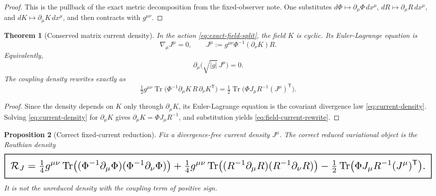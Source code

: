 \documentclass[11pt,a4paper]{article}
\numberwithin{equation}{section}
\DeclareMathOperator{\Tr}{Tr}
\newcommand{\geomboxed}[1]{%
  \setlength{\fboxsep}{8pt}%
  \setlength{\fboxrule}{0.9pt}%
  \fbox{\scalebox{1.5}{$\displaystyle #1$}}%
}
\theoremstyle{thmcompact}
\newtheorem{theorem}{Theorem}[section]
\newtheorem{proposition}[theorem]{Proposition}
\theoremstyle{remark}
\begin{document}
\begin{proof}
This is the pullback of the exact metric decomposition from the fixed-observer note. One substitutes $d\Phi\mapsto\partial_\mu\Phi\,dx^\mu$, $dR\mapsto\partial_\mu R\,dx^\mu$, and $dK\mapsto\partial_\mu K\,dx^\mu$, and then contracts with $g^{\mu\nu}$.
\end{proof}

\begin{theorem}[Conserved matrix current density]
\label{thm:field-current}
In the action \eqref{eq:exact-field-split}, the field $K$ is cyclic. Its Euler-Lagrange equation is
\begin{equation}
\nabla_\mu J^\mu = 0,
\qquad
J^\mu:=g^{\mu\nu}\Phi^{-1}(\partial_\nu K)R.
\label{eq:current-density}
\end{equation}
Equivalently,
\begin{equation}
\partial_\mu\bigl(\sqrt{|g|}\,J^\mu\bigr)=0.
\label{eq:current-density-div}
\end{equation}
The coupling density rewrites exactly as
\begin{equation}
\tfrac12 g^{\mu\nu}\Tr\bigl(\Phi^{-1}\partial_\mu K\,R\,\partial_\nu K^{\mathsf T}\bigr)
=
\tfrac12 \Tr\bigl(\Phi J_\mu R^{-1}(J^\mu)^{\mathsf T}\bigr).
\label{eq:field-current-rewrite}
\end{equation}
\end{theorem}

\begin{proof}
Since the density depends on $K$ only through $\partial_\mu K$, its Euler-Lagrange equation is the covariant divergence law \eqref{eq:current-density}. Solving \eqref{eq:current-density} for $\partial_\mu K$ gives $\partial_\mu K=\Phi J_\mu R^{-1}$, and substitution yields \eqref{eq:field-current-rewrite}.
\end{proof}

\begin{proposition}[Correct fixed-current reduction]
\label{prop:routhian}
Fix a divergence-free current density $J^\mu$. The correct reduced variational object is the Routhian density
\begin{equation}
\geomboxed{
\mathcal R_J
=
\tfrac14 g^{\mu\nu}\Tr\bigl((\Phi^{-1}\partial_\mu\Phi)(\Phi^{-1}\partial_\nu\Phi)\bigr)
+
\tfrac14 g^{\mu\nu}\Tr\bigl((R^{-1}\partial_\mu R)(R^{-1}\partial_\nu R)\bigr)
-
\tfrac12 \Tr\bigl(\Phi J_\mu R^{-1}(J^\mu)^{\mathsf T}\bigr).
}
\label{eq:routhian-density}
\end{equation}
It is not the unreduced density with the coupling term of positive sign.
\end{proposition}
\end{document}
